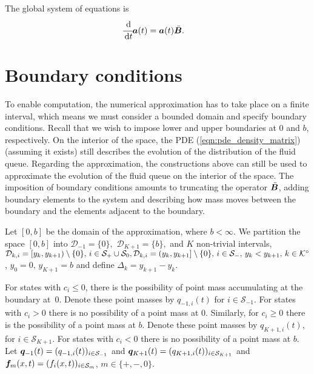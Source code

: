 The global system of equations is 
\begin{align}\label{eqn:DG ODE}
	&\cfrac{\, \mathrm{d}}{\, \mathrm{d} t} \boldsymbol a(t) = \boldsymbol a(t){\ddot{{\boldsymbol B}}}.
\end{align}

\section{Boundary conditions}\label{subsec: boundary DG}
To enable computation, the numerical approximation has to take place on a finite interval, which means we must consider a bounded domain and specify boundary conditions. Recall that we wish to impose lower and upper boundaries at \(0\) and \(b\), respectively. On the interior of the space, the PDE (\ref{eqn:pde_density_matrix}) (assuming it exists) still describes the evolution of the distribution of the fluid queue. Regarding the approximation, the constructions above can still be used to approximate the evolution of the fluid queue on the interior of the space. The imposition of boundary conditions amounts to truncating the operator \(\ddot{\boldsymbol B}\), adding boundary elements to the system and describing how mass moves between the boundary and the elements adjacent to the boundary.  %

Let $[0,b]$ be the domain of the approximation, where $b < \infty$. We partition the space $[0,b]$ into \(\mathcal D_{-1}=\{0\},\) \(\mathcal D_{K+1}=\{b\},\) and \(K\) non-trivial intervals, \(\mathcal{D}_{k,i}=[y_k,y_{k+1})\setminus \{0\},\,i\in\mathcal{S}_+\cup\mathcal{S}_0,\mathcal{D}_{k,i}=(y_k,y_{k+1}]\setminus \{0\},\,i\in\mathcal{S}_-,\, y_k<y_{k+1},\, k\in\mathcal K^\circ\), \(y_0=0,\,y_{K+1}=b\) and define \(\Delta_k = y_{k+1}-y_k\). 

For states with \(c_i\leq 0\), there is the possibility of point mass accumulating at the boundary at~\(0\). Denote these point masses by \(q_{{-1},i}(t)\) for \(i\in\mathcal S_{-1}\). For states with \(c_i>0\) there is no possibility of a point mass at \(0\). Similarly, for \(c_i\geq 0\) there is the possibility of a point mass at \(b\). Denote these point masses by \(q_{{K+1},i}(t)\), for \(i\in\mathcal S_{K+1}\). For states with \(c_i<0\) there is no possibility of a point mass at \(b\). Let \(\boldsymbol q_{-1}(t)=(q_{{-1},i}(t))_{i\in\mathcal{S}_{-1}}\) and \(\boldsymbol q_{K+1}(t) = (q_{{K+1},i}(t))_{i\in\mathcal{S}_{K+1}}\) and \(\boldsymbol f_m(x,t) = (f_i(x,t))_{i\in\mathcal{S}_m}\), \(m\in\{+,-,0\}\). 

